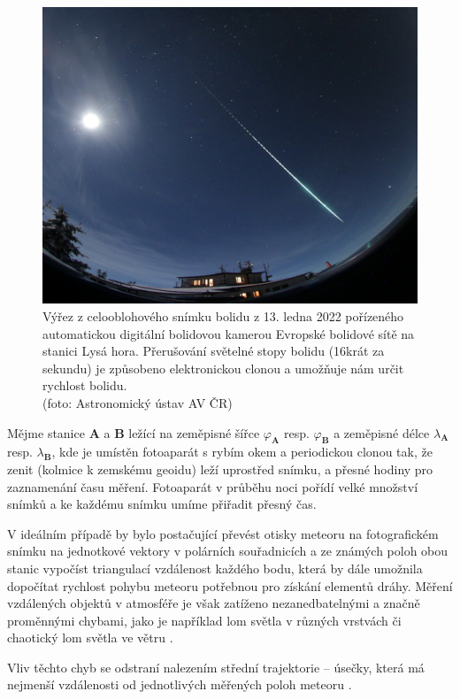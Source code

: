 \begin{figure}[ht]
    \centering
    \includegraphics[width=0.7\linewidth]{img/meteors/night-whole-sky.jpg}
    \caption[Výřez z celooblohového snímku bolidu]{
        Výřez z celooblohového snímku bolidu z 13. ledna 2022 pořízeného automatickou digitální bolidovou kamerou Evropské bolidové sítě na stanici Lysá hora. Přerušování světelné stopy bolidu (16krát za sekundu) je způsobeno elektronickou clonou a umožňuje nám určit rychlost bolidu.\\
        {\small (foto: Astronomický ústav AV ČR)}
    }
\end{figure}

\medskip

Mějme stanice \textbf{A} a \textbf{B} ležící na zeměpisné šířce $\varphi_\mathbf{A}$ resp. $\varphi_\mathbf{B}$ a zeměpisné délce $\lambda_\mathbf{A}$ resp. $\lambda_\mathbf{B}$, kde je umístěn fotoaparát s rybím okem a periodickou clonou tak, že zenit (kolmice k zemskému geoidu) leží uprostřed snímku, a přesné hodiny pro zaznamenání času měření. Fotoaparát v průběhu noci pořídí velké množství snímků a ke každému snímku umíme přiřadit přesný čas.

\smallskip

V ideálním případě by bylo postačující převést otisky  meteoru na fotografickém snímku na jednotkové vektory v polárních souřadnicích a ze známých poloh obou stanic vypočíst triangulací vzdálenost každého bodu, která by dále umožnila dopočítat rychlost pohybu meteoru potřebnou pro získání elementů dráhy. Měření vzdálených objektů v atmosféře je však zatíženo nezanedbatelnými a značně proměnnými chybami, jako je například lom světla v různých vrstvách či chaotický lom světla ve větru \cite{radiosurvey}.

Vliv těchto chyb se odstraní nalezením střední trajektorie -- úsečky, která má nejmenší vzdálenosti od jednotlivých měřených poloh meteoru \cite{ceplecha}.

